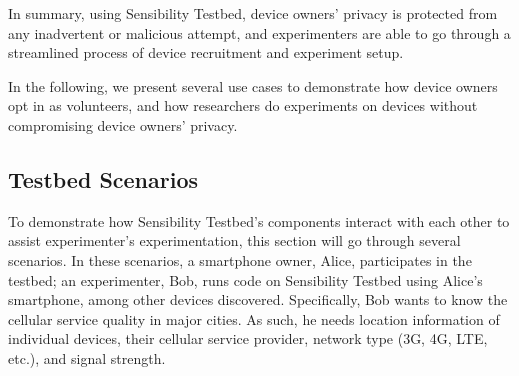 \smallskip
In summary, 
%
%
using Sensibility Testbed, device owners' privacy is protected
from any inadvertent or malicious attempt, and experimenters 
are able to go through a streamlined process of device 
recruitment and experiment setup.

In the following, we present several use cases to
demonstrate how device owners opt in as volunteers, and how
researchers do experiments on devices without compromising device
owners' privacy.

\subsection{Testbed Scenarios}\label{sec-scenario}
To demonstrate how Sensibility Testbed's components interact with
each other to assist experimenter's experimentation, this section will go
through several scenarios. In these scenarios, a smartphone owner, Alice,
participates in the testbed; an experimenter, Bob, runs code on
Sensibility Testbed using Alice's smartphone, among other
devices discovered. Specifically, Bob wants to know the cellular service
quality in major cities. As such, he needs location information
of individual devices, their cellular service provider, network
type (3G, 4G, LTE, etc.), and signal strength.

